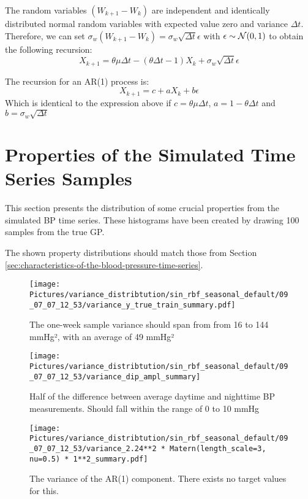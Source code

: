 The random variables $(W_{k+1} - W_k)$ are independent and identically distributed normal random variables
with expected value zero and variance $\Delta t$.
Therefore, we can set $\sigma_w (W_{k+1} - W_k) = \sigma_w \sqrt{\Delta t} \epsilon$ with $\epsilon \sim \operatorname{\mathcal{N}}(0,1)$
to obtain the following recursion:
$$ X_{k+1} = \theta \mu \Delta t - (\theta \Delta t - 1) X_k + \sigma_w \sqrt{\Delta t} \epsilon$$

The recursion for an AR(1) process is:
$$ X_{k+1} = c + a X_k + b \epsilon$$
Which is identical to the expression above if $c= \theta \mu \Delta t$, $a=1- \theta \Delta t$ and
$b= \sigma_w \sqrt{\Delta t}$



\section{Properties of the Simulated Time Series Samples}\label{sec:properties-of-the-simulated-time-series-samples}

This section presents the distribution of some crucial properties
from the simulated BP time series.
These histograms have been created by drawing 100 samples from the true GP.

The shown property distributions should match those from Section \ref{sec:characteristics-of-the-blood-pressure-time-series}.

\begin{figure}[h!]
    \centering
    \texttt{[image: 
        Pictures/variance\_distribtution/sin\_rbf\_seasonal\_default/09\_07\_07\_12\_53/variance\_y\_true\_train\_summary.pdf]}
    \caption{The one-week sample variance should span from from 16 to 144 mmHg², with an average of 49 mmHg²}
    \label{fig:variance}
\end{figure}

\begin{figure}[h!]
    \centering
    \texttt{[image: 
       Pictures/variance\_distribtution/sin\_rbf\_seasonal\_default/09\_07\_07\_12\_53/variance\_dip\_ampl\_summary]}
    \caption{Half of the difference between average daytime and nighttime BP measurements. Should fall
    within the range of 0 to 10 mmHg}
    \label{fig:dip_ampl}
\end{figure}



\begin{figure}[h!]
    \centering
    \texttt{[image: 
       Pictures/variance\_distribtution/sin\_rbf\_seasonal\_default/09\_07\_07\_12\_53/variance\_2.24**2 * Matern(length\_scale=3, nu=0.5) * 1**2\_summary.pdf]}
    \caption{The variance of the AR(1) component. There exists no target values for this.}
    \label{fig:var_matern}
\end{figure}

